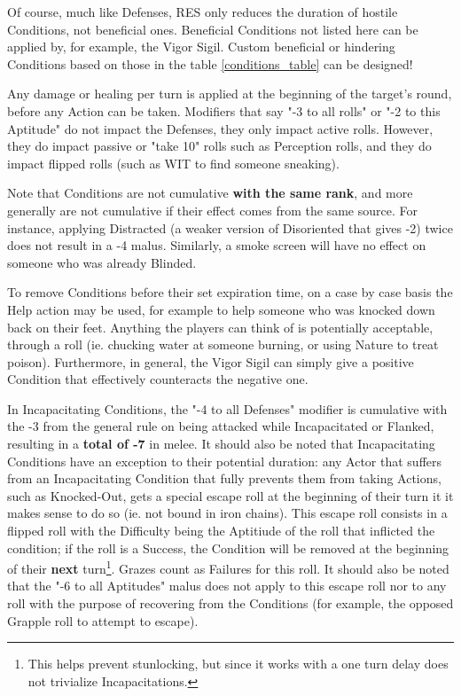 Of course, much like Defenses, RES only reduces the duration of hostile Conditions, not beneficial ones. Beneficial Conditions not listed here can be applied by, for example, the Vigor Sigil. Custom beneficial or hindering Conditions based on those in the table \ref{conditions_table} can be designed!

Any damage or healing per turn is applied at the beginning of the target's round, before any Action can be taken. Modifiers that say "-3 to all rolls" or "-2 to this Aptitude" do not impact the Defenses, they only impact active rolls. However, they do impact passive or "take 10" rolls such as Perception rolls, and they do impact flipped rolls (such as WIT to find someone sneaking).

Note that Conditions are not cumulative \textbf{with the same rank}, and more generally are not cumulative if their effect comes from the same source. For instance, applying Distracted (a weaker version of Disoriented that gives -2) twice does not result in a -4 malus. Similarly, a smoke screen will have no effect on someone who was already Blinded.

To remove Conditions before their set expiration time, on a case by case basis the Help action may be used, for example to help someone who was knocked down back on their feet. Anything the players can think of is potentially acceptable, through a roll (ie. chucking water at someone burning, or using Nature to treat poison). Furthermore, in general, the Vigor Sigil can simply give a positive Condition that effectively counteracts the negative one.

In Incapacitating Conditions, the "-4 to all Defenses" modifier is cumulative with the -3 from the general rule on being attacked while Incapacitated or Flanked, resulting in a \textbf{total of -7} in melee. It should also be noted that Incapacitating Conditions have an exception to their potential duration: any Actor that suffers from an Incapacitating Condition that fully prevents them from taking Actions, such as Knocked-Out, gets a special escape roll at the beginning of their turn it it makes sense to do so (ie. not bound in iron chains). This escape roll consists in a flipped roll with the Difficulty being the Aptitiude of the roll that inflicted the condition; if the roll is a Success, the Condition will be removed at the beginning of their \textbf{next} turn\footnote{This helps prevent stunlocking, but since it works with a one turn delay does not trivialize Incapacitations.}. Grazes count as Failures for this roll. It should also be noted that the "-6 to all Aptitudes" malus does not apply to this escape roll nor to any roll with the purpose of recovering from the Conditions (for example, the opposed Grapple roll to attempt to escape).


